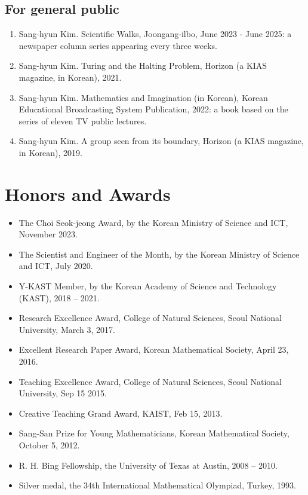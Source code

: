 \documentclass[11pt,a4paper]{article}
\begin{document}
\subsection*{For general public}
\begin{enumerate}[leftmargin=1.5em, label=\arabic*.]
\item Sang-hyun Kim. Scientific Walks, Joongang-ilbo, June 2023 - June 2025: a newspaper column series appearing every three weeks.
\item Sang-hyun Kim. Turing and the Halting Problem, Horizon (a KIAS magazine, in Korean), 2021.
\item Sang-hyun Kim. Mathematics and Imagination (in Korean), Korean Educational Broadcasting System Publication, 2022: a book based on the series of eleven TV public lectures.
\item Sang-hyun Kim. A group seen from its boundary, Horizon (a KIAS magazine, in Korean), 2019.
\end{enumerate}

\section*{Honors and Awards}
\begin{itemize}[leftmargin=1.5em]
\item The Choi Seok-jeong Award, by the Korean Ministry of Science and ICT, November 2023.
\item The Scientist and Engineer of the Month, by the Korean Ministry of Science and ICT, July 2020.
\item Y-KAST Member, by the Korean Academy of Science and Technology (KAST), 2018 -- 2021.
\item Research Excellence Award, College of Natural Sciences, Seoul National University, March 3, 2017.
\item Excellent Research Paper Award, Korean Mathematical Society, April 23, 2016.
\item Teaching Excellence Award, College of Natural Sciences, Seoul National University, Sep 15 2015.
\item Creative Teaching Grand Award, KAIST, Feb 15, 2013.
\item Sang-San Prize for Young Mathematicians, Korean Mathematical Society, October 5, 2012.
\item R. H. Bing Fellowship, the University of Texas at Austin, 2008 -- 2010.
\item Silver medal, the 34th International Mathematical Olympiad, Turkey, 1993.
\end{itemize}
\end{document}
